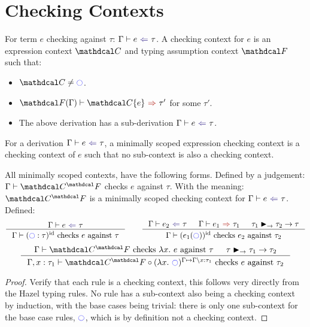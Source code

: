 \section{Checking Contexts}
\begin{definition}
\label{def:CheckingContext}
For term $e$ checking against $\tau$: $\analysis[\Gamma]{e}{\tau}$. A checking context for $e$ is an expression context $\C$ and typing assumption context $\F$ such that: 
\begin{itemize}
\item $\C \neq \cmark$.
\item $\synthesis[\F(\Gamma)]{\C\{e\}}{\tau'}$ for some $\tau'$.
\item The above derivation has a sub-derivation $\analysis[\Gamma]{e}{\tau}$.
\end{itemize}
\end{definition}
\begin{definition}
For a derivation $\analysis[\Gamma]{e}{\tau}$, a minimally scoped expression checking context is a checking context of $e$ such that no sub-context is also a checking context.
\end{definition}

\begin{proposition}
All minimally scoped contexts, have the following forms. Defined by a judgement: $\Gamma \vdash \C^\F$ checks $e$ against $\tau$. With the meaning: $\C^\F$ is a minimally scoped checking context for $\analysis{e}{\tau}$. Defined:
\[\inference{\analysis{e}{\tau}}{\Gamma \vdash (\cmark : \tau)^{\mathrm{id}} \text{ checks } e \text{ against } \tau} \qquad \inference{\analysis{e_2}{\tau} & \synthesis{e_1}{\tau_1} & \tau_1 \funmatch \tau_2 \to \tau}{\Gamma \vdash (e_1(\cmark))^{\mathrm{id}} \text{ checks } e_2 \text{ against } \tau_2}\]
\[\inference{\Gamma \vdash \C^\F \text{ checks } \lambda x.\ e \text{ against } \tau & \tau \funmatch \tau_1 \to \tau_2}{\Gamma, x:\tau_1 \vdash \C^\F \circ (\lambda x.\ \cmark)^{\Gamma \mapsto \Gamma\backslash x:\tau_1} \text{ checks } e \text{ against } \tau_2}\]
\end{proposition}
\begin{proof}
Verify that each rule is a checking context, this follows very directly from the Hazel typing rules. No rule has a sub-context also being a checking context by induction, with the base cases being trivial: there is only one sub-context for the base case rules, $\cmark$, which is by definition not a checking context.
\end{proof}

